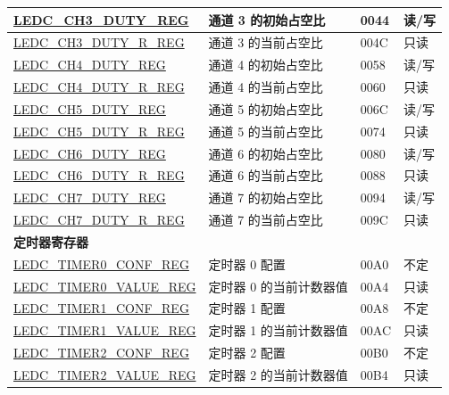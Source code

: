 \begin{longtable}{ | p{6cm} | p{7.2cm} | p{1.3cm} | p{1cm} | }
\hyperref[regdesc:LEDCCHNDUTYREG]{LEDC\_CH3\_DUTY\_REG} & 通道 3 的初始占空比 & \hexprefix{}0044 & 读/写 \\ \hline
\hyperref[regdesc:LEDCCHNDUTYRREG]{LEDC\_CH3\_DUTY\_R\_REG} & 通道 3 的当前占空比 & \hexprefix{}004C & 只读 \\ \hline
\hyperref[regdesc:LEDCCHNDUTYREG]{LEDC\_CH4\_DUTY\_REG} & 通道 4 的初始占空比 & \hexprefix{}0058 & 读/写 \\ \hline
\hyperref[regdesc:LEDCCHNDUTYRREG]{LEDC\_CH4\_DUTY\_R\_REG} & 通道 4 的当前占空比 & \hexprefix{}0060 & 只读 \\ \hline
\hyperref[regdesc:LEDCCHNDUTYREG]{LEDC\_CH5\_DUTY\_REG} & 通道 5 的初始占空比 & \hexprefix{}006C & 读/写 \\ \hline
\hyperref[regdesc:LEDCCHNDUTYRREG]{LEDC\_CH5\_DUTY\_R\_REG} & 通道 5 的当前占空比 & \hexprefix{}0074 & 只读 \\ \hline
\hyperref[regdesc:LEDCCHNDUTYREG]{LEDC\_CH6\_DUTY\_REG} & 通道 6 的初始占空比 & \hexprefix{}0080 & 读/写 \\ \hline
\hyperref[regdesc:LEDCCHNDUTYRREG]{LEDC\_CH6\_DUTY\_R\_REG} & 通道 6 的当前占空比 & \hexprefix{}0088 & 只读 \\ \hline
\hyperref[regdesc:LEDCCHNDUTYREG]{LEDC\_CH7\_DUTY\_REG} & 通道 7 的初始占空比 & \hexprefix{}0094 & 读/写 \\ \hline
\hyperref[regdesc:LEDCCHNDUTYRREG]{LEDC\_CH7\_DUTY\_R\_REG} & 通道 7 的当前占空比 & \hexprefix{}009C & 只读 \\ \hline
\multicolumn{4}{|l|}{\textbf{定时器寄存器}} \\ \hline
\hyperref[regdesc:LEDCTIMERXCONFREG]{LEDC\_TIMER0\_CONF\_REG} & 定时器 0 配置 & \hexprefix{}00A0 & 不定 \\ \hline
\hyperref[regdesc:LEDCTIMERXVALUEREG]{LEDC\_TIMER0\_VALUE\_REG} & 定时器 0 的当前计数器值 & \hexprefix{}00A4 & 只读 \\ \hline
\hyperref[regdesc:LEDCTIMERXCONFREG]{LEDC\_TIMER1\_CONF\_REG} & 定时器 1 配置 & \hexprefix{}00A8 & 不定 \\ \hline
\hyperref[regdesc:LEDCTIMERXVALUEREG]{LEDC\_TIMER1\_VALUE\_REG} & 定时器 1 的当前计数器值 & \hexprefix{}00AC & 只读 \\ \hline
\hyperref[regdesc:LEDCTIMERXCONFREG]{LEDC\_TIMER2\_CONF\_REG} & 定时器 2 配置 & \hexprefix{}00B0 & 不定 \\ \hline
\hyperref[regdesc:LEDCTIMERXVALUEREG]{LEDC\_TIMER2\_VALUE\_REG} & 定时器 2 的当前计数器值 & \hexprefix{}00B4 & 只读 \\ \hline

\end{longtable}
